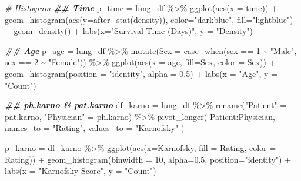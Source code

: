 \documentclass[
]{article}
\newenvironment{Shaded}{\begin{snugshade}}{\end{snugshade}}
\newcommand{\AttributeTok}[1]{\textcolor[rgb]{0.77,0.63,0.00}{#1}}
\newcommand{\CommentTok}[1]{\textcolor[rgb]{0.56,0.35,0.01}{\textit{#1}}}
\newcommand{\DecValTok}[1]{\textcolor[rgb]{0.00,0.00,0.81}{#1}}
\newcommand{\DocumentationTok}[1]{\textcolor[rgb]{0.56,0.35,0.01}{\textbf{\textit{#1}}}}
\newcommand{\FloatTok}[1]{\textcolor[rgb]{0.00,0.00,0.81}{#1}}
\newcommand{\FunctionTok}[1]{\textcolor[rgb]{0.00,0.00,0.00}{#1}}
\newcommand{\NormalTok}[1]{#1}
\newcommand{\OtherTok}[1]{\textcolor[rgb]{0.56,0.35,0.01}{#1}}
\newcommand{\SpecialCharTok}[1]{\textcolor[rgb]{0.00,0.00,0.00}{#1}}
\newcommand{\StringTok}[1]{\textcolor[rgb]{0.31,0.60,0.02}{#1}}
\begin{document}
\begin{Shaded}
\begin{Highlighting}[]
\CommentTok{\# Histogram}
\DocumentationTok{\#\# Time}
\NormalTok{p\_time }\OtherTok{=} 
\NormalTok{  lung\_df }\SpecialCharTok{\%\textgreater{}\%}
  \FunctionTok{ggplot}\NormalTok{(}\FunctionTok{aes}\NormalTok{(}\AttributeTok{x =}\NormalTok{ time)) }\SpecialCharTok{+} 
  \FunctionTok{geom\_histogram}\NormalTok{(}\FunctionTok{aes}\NormalTok{(}\AttributeTok{y=}\FunctionTok{after\_stat}\NormalTok{(density)), }\AttributeTok{color=}\StringTok{"darkblue"}\NormalTok{, }\AttributeTok{fill=}\StringTok{"lightblue"}\NormalTok{) }\SpecialCharTok{+}
  \FunctionTok{geom\_density}\NormalTok{() }\SpecialCharTok{+}
  \FunctionTok{labs}\NormalTok{(}\AttributeTok{x=}\StringTok{"Survival Time (Days)"}\NormalTok{,}
       \AttributeTok{y =} \StringTok{"Density"}\NormalTok{)}

\DocumentationTok{\#\# Age}
\NormalTok{p\_age }\OtherTok{=} 
\NormalTok{  lung\_df }\SpecialCharTok{\%\textgreater{}\%}
  \FunctionTok{mutate}\NormalTok{(}\AttributeTok{Sex =} \FunctionTok{case\_when}\NormalTok{(sex }\SpecialCharTok{==} \DecValTok{1} \SpecialCharTok{\textasciitilde{}} \StringTok{"Male"}\NormalTok{,}
\NormalTok{                         sex }\SpecialCharTok{==} \DecValTok{2} \SpecialCharTok{\textasciitilde{}} \StringTok{"Female"}\NormalTok{)) }\SpecialCharTok{\%\textgreater{}\%}
  \FunctionTok{ggplot}\NormalTok{(}\FunctionTok{aes}\NormalTok{(}\AttributeTok{x =}\NormalTok{ age, }\AttributeTok{fill=}\NormalTok{Sex, }\AttributeTok{color =}\NormalTok{ Sex)) }\SpecialCharTok{+} 
  \FunctionTok{geom\_histogram}\NormalTok{(}\AttributeTok{position =} \StringTok{"identity"}\NormalTok{, }\AttributeTok{alpha =} \FloatTok{0.5}\NormalTok{) }\SpecialCharTok{+}
  \FunctionTok{labs}\NormalTok{(}\AttributeTok{x =} \StringTok{"Age"}\NormalTok{,}
       \AttributeTok{y =} \StringTok{"Count"}\NormalTok{)}

\DocumentationTok{\#\# ph.karno \& pat.karno}
\NormalTok{df\_karno }\OtherTok{=}\NormalTok{ lung\_df }\SpecialCharTok{\%\textgreater{}\%}
  \FunctionTok{rename}\NormalTok{(}\StringTok{"Patient"} \OtherTok{=}\NormalTok{ pat.karno,}
        \StringTok{"Physician"} \OtherTok{=}\NormalTok{ ph.karno) }\SpecialCharTok{\%\textgreater{}\%}
  \FunctionTok{pivot\_longer}\NormalTok{(}
\NormalTok{    Patient}\SpecialCharTok{:}\NormalTok{Physician,}
    \AttributeTok{names\_to =} \StringTok{"Rating"}\NormalTok{,}
    \AttributeTok{values\_to =} \StringTok{"Karnofsky"}
\NormalTok{  )}

\NormalTok{p\_karno }\OtherTok{=}
\NormalTok{  df\_karno }\SpecialCharTok{\%\textgreater{}\%}
  \FunctionTok{ggplot}\NormalTok{(}\FunctionTok{aes}\NormalTok{(}\AttributeTok{x=}\NormalTok{Karnofsky, }\AttributeTok{fill =}\NormalTok{ Rating, }\AttributeTok{color =}\NormalTok{ Rating)) }\SpecialCharTok{+} 
  \FunctionTok{geom\_histogram}\NormalTok{(}\AttributeTok{binwidth =} \DecValTok{10}\NormalTok{, }\AttributeTok{alpha=}\FloatTok{0.5}\NormalTok{, }\AttributeTok{position=}\StringTok{"identity"}\NormalTok{) }\SpecialCharTok{+} 
  \FunctionTok{labs}\NormalTok{(}\AttributeTok{x =} \StringTok{"Karnofsky Score"}\NormalTok{,}
       \AttributeTok{y =} \StringTok{"Count"}\NormalTok{)}


\end{Highlighting}
\end{Shaded}
\end{document}
